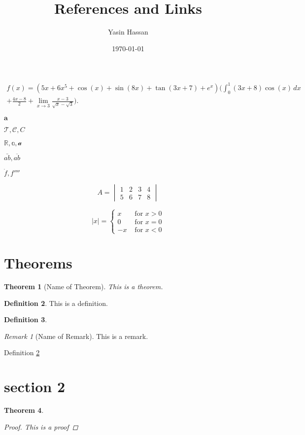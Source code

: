 \documentclass{article}
\title{References and Links}
\author{Yasin Hassan}
\date{\today}
\theoremstyle{plain}
\newtheorem{theorem}{Theorem}[section]
\theoremstyle{definition}
\newtheorem{definition}[theorem]{Definition}
\theoremstyle{remark}
\newtheorem*{remark}{Remark}
\begin{document}
\maketitle

\begin{multline}
    f(x)=(5x+6x^5+\cos(x)+\sin(8x)+\tan(3x+7)+e^x)\Bigg(\int_{0}^{1}(3x+8)\cos(x)\,dx\\+\frac{4x-8}{2}+\lim_{x\to 3}\frac{x-3}{\sqrt{x}-\sqrt{3}}\Bigg).
\end{multline}

$\mathbf{a}$

$\mathcal{T}, \mathcal{C}, C$

$\mathbb{R}, \mathbb{a}, \mathcal{a}$

$\bar{ab}, \overline{ab}$

$\dot f, f''''$

\[
A =
\begin{vmatrix} %
1 & 2 & 3 & 4\\
5 & 6 & 7 & 8
\end{vmatrix}
\]

\[
|x| = 
\begin{cases}
x & \text{ for } x>0\\
0 & \text{ for } x=0\\
-x & \text{ for } x<0
\end{cases}
\]

\section{Theorems}
\begin{theorem}[Name of Theorem]
This is a theorem.
\end{theorem}
\begin{definition}\label{def: this is a def}
This is a definition.
\end{definition}
\begin{definition}

\end{definition}
\begin{remark}[Name of Remark]
This is a remark.
\end{remark}

Definition \ref{def: this is a def}
\section{section 2}
\begin{theorem}
\begin{proof}
This is a proof
\end{proof}
\end{theorem}
\end{document}
